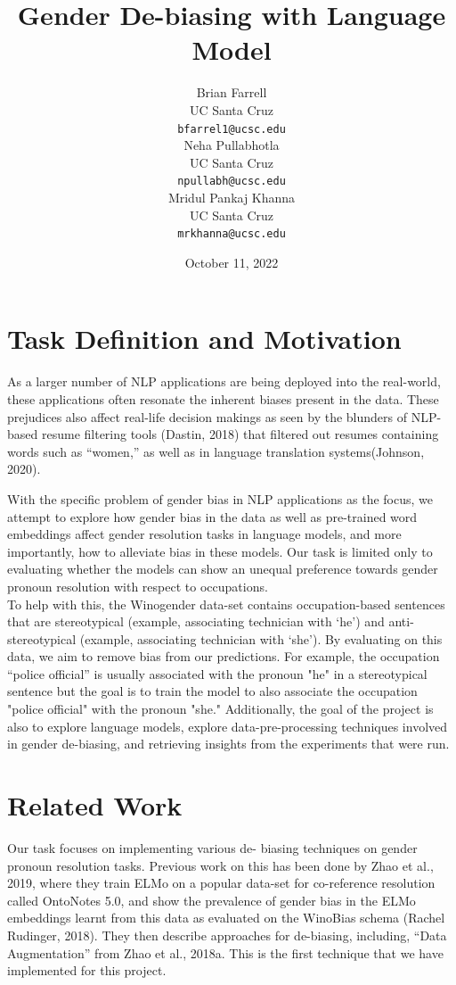 \documentclass[10pt]{article}
\title{Gender De-biasing with Language Model}
\author{
  Brian Farrell \\
  UC Santa Cruz \\
  {\tt bfarrel1@ucsc.edu} \\\And
  Neha Pullabhotla \\
  UC Santa Cruz \\
  {\tt npullabh@ucsc.edu} \\\And
  Mridul Pankaj Khanna \\
  UC Santa Cruz \\
  {\tt mrkhanna@ucsc.edu} \\}
\date{October 11, 2022}
\begin{document}
\maketitle

\section{Task Definition and Motivation}

As a larger number of NLP applications are being deployed into the real-world, these applications often resonate the inherent biases present in the data. These prejudices also affect real-life decision makings as seen by the blunders of NLP-based resume filtering tools (Dastin, 2018) that filtered out resumes containing words such as “women,” as well as in language translation systems(Johnson, 2020).

With the specific problem of gender bias in NLP applications as the focus, we attempt to explore how gender bias in the data as well as pre-trained word embeddings affect gender resolution tasks in language models, and more importantly, how to alleviate bias in these models. Our task is limited only to evaluating whether the models can show an unequal preference towards gender pronoun resolution with respect to occupations.\\
To help with this, the Winogender data-set contains occupation-based sentences that are stereotypical (example, associating technician with ‘he’) and anti-stereotypical (example, associating technician with ‘she’). By evaluating on this data, we aim to remove bias from our predictions. For example, the occupation “police official” is usually associated with the pronoun "he" in a stereotypical sentence but the goal is to train the model to also associate the occupation "police official" with the pronoun "she." Additionally, the goal of the project is also to explore language models, explore data-pre-processing techniques involved in gender de-biasing, and retrieving insights from the experiments that were run.

\section{Related Work }
Our task focuses on implementing various de- biasing techniques on gender pronoun resolution tasks. Previous work on this has been done by Zhao et al., 2019, where they train ELMo on a popular data-set for co-reference resolution called OntoNotes 5.0, and show the prevalence of gender bias in the ELMo embeddings learnt from this data as evaluated on the WinoBias schema (Rachel Rudinger, 2018). They then describe approaches for de-biasing, including, “Data Augmentation” from Zhao et al., 2018a. This is the first technique that we have implemented for this project.
\end{document}
